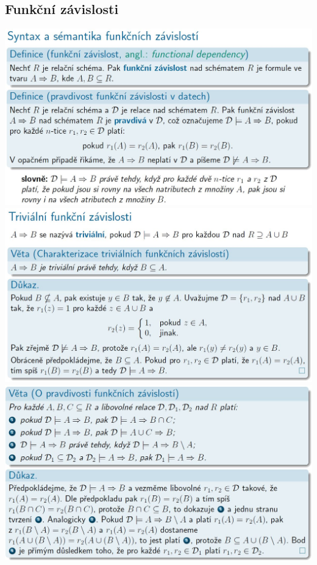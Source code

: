 \documentclass[10pt,a4paper]{article}
\begin{document}
\subsection{Funkční závislosti}
\includegraphics[scale=0.35]{img/5-01.jpg}\\[2ex]
\includegraphics[scale=0.37]{img/5-02.jpg}\\[2ex]
\includegraphics[scale=0.37]{img/5-03.jpg}\\[2ex]
\end{document}
